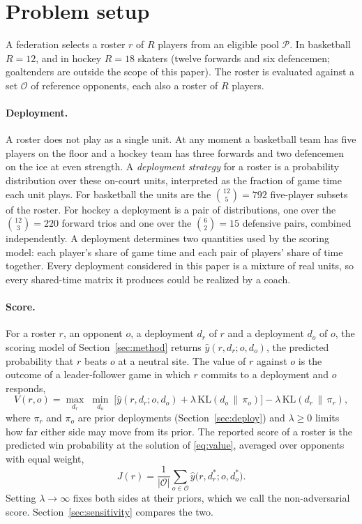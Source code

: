 \section{Problem setup}
\label{sec:problem}

A federation selects a roster $r$ of $R$ players from an eligible pool $\mathcal{P}$. In basketball $R=12$, and in hockey $R=18$ skaters (twelve forwards and six defencemen; goaltenders are outside the scope of this paper). The roster is evaluated against a set $\mathcal{O}$ of reference opponents, each also a roster of $R$ players.

\paragraph{Deployment.} A roster does not play as a single unit. At any moment a basketball team has five players on the floor and a hockey team has three forwards and two defencemen on the ice at even strength. A \emph{deployment strategy} for a roster is a probability distribution over these on-court units, interpreted as the fraction of game time each unit plays. For basketball the units are the $\binom{12}{5}=792$ five-player subsets of the roster. For hockey a deployment is a pair of distributions, one over the $\binom{12}{3}=220$ forward trios and one over the $\binom{6}{2}=15$ defensive pairs, combined independently. A deployment determines two quantities used by the scoring model: each player's share of game time and each pair of players' share of time together. Every deployment considered in this paper is a mixture of real units, so every shared-time matrix it produces could be realized by a coach.

\paragraph{Score.} For a roster $r$, an opponent $o$, a deployment $d_r$ of $r$ and a deployment $d_o$ of $o$, the scoring model of Section~\ref{sec:method} returns $\hat{y}(r,d_r;o,d_o)$, the predicted probability that $r$ beats $o$ at a neutral site. The value of $r$ against $o$ is the outcome of a leader-follower game in which $r$ commits to a deployment and $o$ responds,
\begin{equation}
V(r,o)=\max_{d_r}\;\min_{d_o}\;\Big[\hat{y}(r,d_r;o,d_o)+\lambda\,\mathrm{KL}(d_o\,\|\,\pi_o)\Big]-\lambda\,\mathrm{KL}(d_r\,\|\,\pi_r), \label{eq:value}
\end{equation}
where $\pi_r$ and $\pi_o$ are prior deployments (Section~\ref{sec:deploy}) and $\lambda\ge 0$ limits how far either side may move from its prior. The reported score of a roster is the predicted win probability at the solution of \eqref{eq:value}, averaged over opponents with equal weight,
\begin{equation}
J(r)=\frac{1}{|\mathcal{O}|}\sum_{o\in\mathcal{O}}\hat{y}\big(r,d_r^{*};o,d_o^{*}\big). \label{eq:score}
\end{equation}
Setting $\lambda\to\infty$ fixes both sides at their priors, which we call the non-adversarial score. Section~\ref{sec:sensitivity} compares the two.

